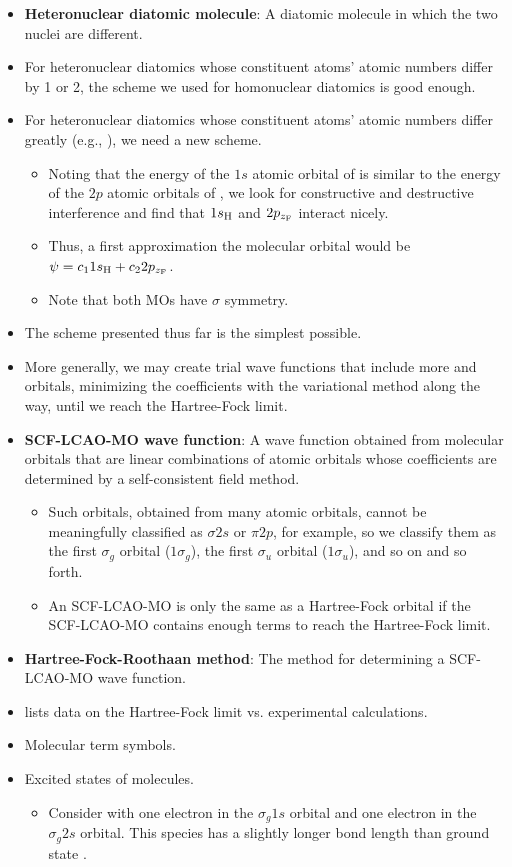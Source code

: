 \documentclass[../notes.tex]{subfiles}
\begin{document}
\begin{itemize}
\begin{itemize}
    \end{itemize}
    \item \textbf{Heteronuclear diatomic molecule}: A diatomic molecule in which the two nuclei are different.
    \item For heteronuclear diatomics whose constituent atoms' atomic numbers differ by 1 or 2, the scheme we used for homonuclear diatomics is good enough.
    \item For heteronuclear diatomics whose constituent atoms' atomic numbers differ greatly (e.g., ), we need a new scheme.
    \begin{itemize}
        \item Noting that the energy of the $1s$ atomic orbital of  is similar to the energy of the $2p$ atomic orbitals of , we look for constructive and destructive interference and find that $1s_{\ce{H}}$ and $2p_{z_{\ce{F}}}$ interact nicely.
        \item Thus, a first approximation the molecular orbital would be $\psi=c_11s_{\ce{H}}+c_22p_{z_{\ce{F}}}$.
        \item Note that both MOs have $\sigma$ symmetry.
    \end{itemize}
    \item The scheme presented thus far is the simplest possible.
    \item More generally, we may create trial wave functions that include more and orbitals, minimizing the coefficients with the variational method along the way, until we reach the Hartree-Fock limit.
    \item \textbf{SCF-LCAO-MO wave function}: A wave function obtained from molecular orbitals that are linear combinations of atomic orbitals whose coefficients are determined by a self-consistent field method.
    \begin{itemize}
        \item Such orbitals, obtained from many atomic orbitals, cannot be meaningfully classified as $\sigma 2s$ or $\pi 2p$, for example, so we classify them as the first $\sigma_g$ orbital ($1\sigma_g$), the first $\sigma_u$ orbital ($1\sigma_u$), and so on and so forth.
        \item An SCF-LCAO-MO is only the same as a Hartree-Fock orbital if the SCF-LCAO-MO contains enough terms to reach the Hartree-Fock limit.
    \end{itemize}
    \item \textbf{Hartree-Fock-Roothaan method}: The method for determining a SCF-LCAO-MO wave function.
    \item \textcite{bib:McQuarrieSimon} lists data on the Hartree-Fock limit vs. experimental calculations.
    \item Molecular term symbols.
    \item Excited states of molecules.
    \begin{itemize}
        \item Consider  with one electron in the $\sigma_g1s$ orbital and one electron in the $\sigma_g2s$ orbital. This species has a slightly longer bond length than ground state .
    \end{itemize}
\end{itemize}
\end{document}
